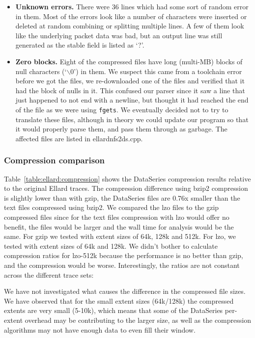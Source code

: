 \begin{itemize}
\item {\bf Unknown errors.} There were 36 lines which had some sort of
random error in them.  Most of the errors look like a number of
characters were inserted or deleted at random combining or splitting
multiple lines.  A few of them look like the underlying packet data
was bad, but an output line was still generated as the stable field is
listed as `?'.

\item {\bf Zero blocks.} Eight of the compressed files have long
(multi-MB) blocks of null characters (`$\backslash0$') in them.  We
suspect this came from a toolchain error before we got the files, we
re-downloaded one of the files and verified that it had the block of
nulls in it.  This confused our parser since it saw a line that just
happened to not end with a newline, but thought it had reached the end
of the file as we were using \texttt{fgets}.  We eventually decided
not to try to translate these files, although in theory we could
update our program so that it would properly parse them, and pass them
through as garbage.  The affected files are listed in ellardnfs2ds.cpp.

\end{itemize}

\subsubsection{Compression comparison}

Table~\ref{table:ellard:compression} shows the DataSeries compression results
relative to the original Ellard traces.  The compression difference
using bzip2 compression is slightly lower than with gzip, the
DataSeries files are 0.76x smaller than the text files compressed
using bzip2.  We compared the lzo files to the gzip compressed files
since for the text files compression with lzo would offer no benefit,
the files would be larger and the wall time for analysis would be the
same.  For gzip we tested with extent sizes of 64k, 128k and 512k.
For lzo, we tested with extent sizes of 64k and 128k.  We didn't
bother to calculate compression ratios for lzo-512k because the
performance is no better than gzip, and the compression would be
worse.  Interestingly, the ratios are not constant across the
different trace sets:

We have not investigated what causes the difference in the compressed
file sizes.  We have observed that for the small extent sizes
(64k/128k) the compressed extents are very small (5-10k), which means
that some of the DataSeries per-extent overhead may be contributing to
the larger size, as well as the compression algorithms may not have
enough data to even fill their window.

